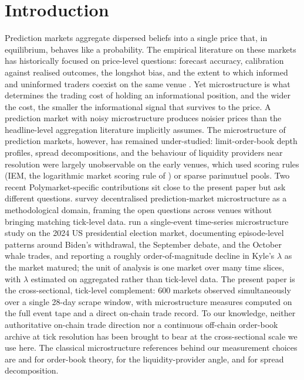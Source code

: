 \documentclass[11pt,a4paper,twocolumn]{article}
\begin{document}
%
\section{Introduction}\label{sec:intro}

Prediction markets aggregate dispersed beliefs into a single price
that, in equilibrium, behaves like a probability. The empirical
literature on these markets has historically focused on price-level
questions: forecast accuracy, calibration against realised outcomes,
the longshot bias, and the extent to which informed and uninformed
traders coexist on the same venue
\citep{wolfers-zitzewitz-2004,manski-2006,page-clemen-2013}.
Yet microstructure is what determines the trading cost of holding an
informational position, and the wider the cost, the smaller the
informational signal that survives to the price. A prediction market
with noisy microstructure produces noisier prices than the
headline-level aggregation literature implicitly assumes.
The microstructure of prediction markets, however, has remained
under-studied: limit-order-book depth profiles, spread decompositions,
and the behaviour of liquidity providers near resolution were largely
unobservable on the early venues, which used scoring rules
(IEM, the logarithmic market scoring rule of \citealt{hanson-2007})
or sparse parimutuel pools. Two recent
Polymarket-specific contributions sit close to the present paper but
ask different questions. \citet{rahman-alchami-clark-2025} survey
decentralised prediction-market microstructure as a methodological
domain, framing the open questions across venues without bringing
matching tick-level data. \citet{tsang-yang-2026} run a single-event
time-series microstructure study on the 2024 US presidential
election market, documenting episode-level patterns around Biden's
withdrawal, the September debate, and the October whale trades, and
reporting a roughly order-of-magnitude decline in Kyle's $\lambda$
as the market matured; the unit of analysis is one market over many
time slices, with $\lambda$ estimated on aggregated rather than
tick-level data. The present paper is the cross-sectional, tick-level
complement: 600 markets observed simultaneously over a single 28-day
scrape window, with microstructure measures computed on the full
event tape and a direct on-chain trade record. To our knowledge,
neither authoritative on-chain trade direction nor a continuous
off-chain order-book archive at tick resolution has been brought to
bear at the cross-sectional scale we use here.
The classical microstructure references behind our measurement
choices are \citet{ohara-1995} and \citet{hasbrouck-2007} for
order-book theory, \citet{foucault-pagano-roell-2013} for the
liquidity-provider angle, and
\citet{huang-stoll-1997,madhavan-richardson-roomans-1997} for spread
decomposition.
\end{document}
